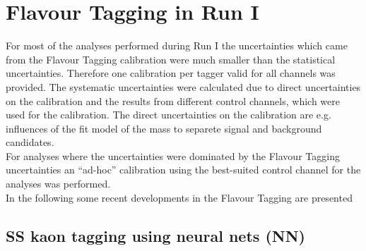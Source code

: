 \documentclass{PoS}
\begin{document}
\section{Flavour Tagging in Run I}\label{sec:4}

For most of the analyses performed during Run I the uncertainties which came from the Flavour Tagging calibration were much smaller than the statistical uncertainties. Therefore one calibration per tagger valid for all channels was provided. The systematic uncertainties were calculated due to direct uncertainties on the calibration and the results from different control channels, which were used for the calibration. The direct uncertainties on the calibration are e.g. influences of the fit model of the mass to separete signal and background candidates.\\
For analyses where the uncertainties were dominated by the Flavour Tagging uncertainties an \enquote{ad-hoc} calibration using the best-suited control channel for the analyses was performed. \\
In the following some recent developments in the Flavour Tagging are presented

\subsection{SS kaon tagging using neural nets (NN)}
\end{document}
